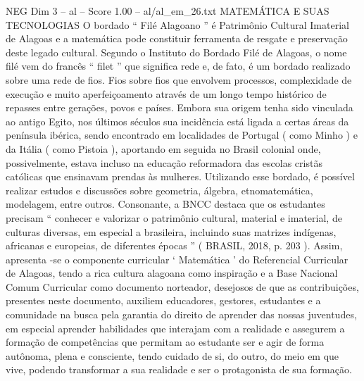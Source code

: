\begin{textsample}{NEG Dim 3 – al – Score 1.00 – al/al\_em\_26.txt}  \label{ex:f3_neg_076}
MATEMÁTICA E SUAS TECNOLOGIAS O bordado “ Filé Alagoano ” é Patrimônio Cultural Imaterial de Alagoas e a matemática pode constituir ferramenta de resgate e preservação deste legado cultural.
Segundo o Instituto do Bordado Filé de Alagoas, o nome filé vem do francês “ filet ” que significa rede e, de fato, é um bordado realizado sobre uma rede de fios.
Fios sobre fios que envolvem processos, complexidade de execução e muito aperfeiçoamento através de um longo tempo histórico de repasses entre gerações, povos e países.
Embora sua origem tenha sido vinculada ao antigo Egito, nos últimos séculos sua incidência está ligada a certas áreas da península ibérica, sendo encontrado em localidades de Portugal ( como Minho ) e da Itália ( como Pistoia ), aportando em seguida no Brasil colonial onde, possivelmente, estava incluso na educação reformadora das escolas cristãs católicas que ensinavam prendas às mulheres.
Utilizando esse bordado, é possível realizar estudos e discussões sobre geometria, álgebra, etnomatemática, modelagem, entre outros.
Consonante, a BNCC destaca que os estudantes precisam “ conhecer e valorizar o patrimônio cultural, material e imaterial, de culturas diversas, em especial a brasileira, incluindo suas matrizes indígenas, africanas e europeias, de diferentes épocas ” ( BRASIL, 2018, p. 203 ).
Assim, apresenta -se o componente curricular ‘ Matemática ’ do Referencial Curricular de Alagoas, tendo a rica cultura alagoana como inspiração e a Base Nacional Comum Curricular como documento norteador, desejosos de que as contribuições, presentes neste documento, auxiliem educadores, gestores, estudantes e a comunidade na busca pela garantia do direito de aprender das nossas juventudes, em especial aprender habilidades que interajam com a realidade e assegurem a formação de competências que permitam ao estudante ser e agir de forma autônoma, plena e consciente, tendo cuidado de si, do outro, do meio em que vive, podendo transformar a sua realidade e ser o protagonista de sua formação.

\end{textsample}

